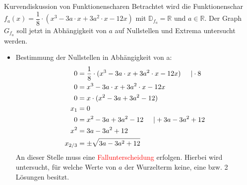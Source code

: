 \begin{bsp}{Kurvendiskussion von Funktionenscharen}{}
Betrachtet wird die Funktionenschar $f_a(x) = \dfrac{1}{8} \cdot (x^3 - 3a\cdot x +3a^2 \cdot x -12x)$ mit $\mathds{D}_{f_a} = \mathds{R}$ und $a \in \mathds{R}$. Der Graph $G_{f_a}$ soll jetzt in Abhängigkeit von $a$ auf Nullstellen und Extrema untersucht werden.
\begin{itemize}
    \item Bestimmung der Nullstellen in Abhängigkeit von a:
\begin{equation*}
    \begin{split}
         0 &= \dfrac{1}{8} \cdot (x^3 - 3a\cdot x +3a^2 \cdot x -12x) \hspace{0.5cm} | \cdot 8\\
         0 &= x^3 - 3a\cdot x +3a^2 \cdot x -12x\\
         0 &= x\cdot(x^2 -3a + 3a^2 -12)\\
         x_1&= 0\\
         0 &= x^2 -3a+3a^2 -12\hspace{0.5cm} | +3a-3a^2+12\\
         x^2 &= 3a-3a^2+12\\
         x_{2/3} &= \pm \sqrt{3a-3a^2+12}
        \end{split}
\end{equation*}
An dieser Stelle muss eine \textcolor{red}{Fallunterscheidung} erfolgen. Hierbei wird untersucht, für welche Werte von $a$ der Wurzelterm keine, eine bzw. 2 Lösungen besitzt.

\begin{enumerate}


\end{enumerate}
\end{itemize}
\end{bsp}
